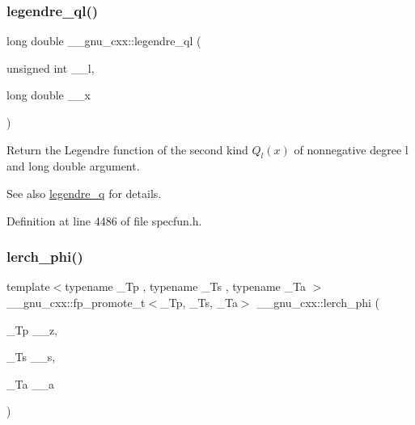 \subsubsection{\texorpdfstring{legendre\+\_\+ql()}{legendre\_ql()}}
{\footnotesize\ttfamily long double \+\_\+\+\_\+gnu\+\_\+cxx\+::legendre\+\_\+ql (\begin{DoxyParamCaption}\item[{unsigned int}]{\+\_\+\+\_\+l,  }\item[{long double}]{\+\_\+\+\_\+x }\end{DoxyParamCaption})\hspace{0.3cm}{\ttfamily [inline]}}

Return the Legendre function of the second kind $ Q_l(x) $ of nonnegative degree {\ttfamily l} and {\ttfamily long double} argument.

\begin{DoxySeeAlso}{See also}
\hyperlink{group__mathsf__gnu_gadad5b22d0075dca31690907668af568f}{legendre\+\_\+q} for details. 
\end{DoxySeeAlso}


Definition at line 4486 of file specfun.\+h.

\mbox{\label{group__mathsf__gnu_ga31d7cfc601a99d72e58f654d0c890fd6}} 
\subsubsection{\texorpdfstring{lerch\+\_\+phi()}{lerch\_phi()}}
{\footnotesize\ttfamily template$<$typename \+\_\+\+Tp , typename \+\_\+\+Ts , typename \+\_\+\+Ta $>$ \\
\+\_\+\+\_\+gnu\+\_\+cxx\+::fp\+\_\+promote\+\_\+t$<$\+\_\+\+Tp, \+\_\+\+Ts, \+\_\+\+Ta$>$ \+\_\+\+\_\+gnu\+\_\+cxx\+::lerch\+\_\+phi (\begin{DoxyParamCaption}\item[{\+\_\+\+Tp}]{\+\_\+\+\_\+z,  }\item[{\+\_\+\+Ts}]{\+\_\+\+\_\+s,  }\item[{\+\_\+\+Ta}]{\+\_\+\+\_\+a }\end{DoxyParamCaption})\hspace{0.3cm}{\ttfamily [inline]}}

